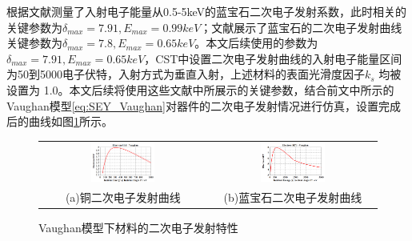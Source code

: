 \documentclass[master]{thesis-uestc}
\begin{document}
根据文献\cite{suharyanto_2006_secondary}测量了入射电子能量从0.5-5keV的蓝宝石二次电子发射系数，此时相关的关键参数为$\delta_{max}=7.91, E_{max}=0.99keV$；文献\cite{chvyreva_2014_experimental}展示了蓝宝石的二次电子发射曲线关键参数为$\delta_{max}=7.8, E_{max}=0.65keV$。本文后续使用的参数为$\delta_{max}=7.91, E_{max}=0.65keV$，CST中设置二次电子发射曲线的入射电子能量区间为50到5000电子伏特，入射方式为垂直入射，上述材料的表面光滑度因子\(k_s\) 均被设置为 1.0。本文后续将使用这些文献中所展示的关键参数，结合前文中所示的Vaughan模型\ref{eq:SEY_Vaughan}对器件的二次电子发射情况进行仿真，设置完成后的曲线如图\ref{fig:X波段材料二次电子发射特性}所示。
\begin{figure}[!htb]
    \small
    \centering
    \begin{tabular}{@{\ }c@{\ }c}
        \includegraphics[width=0.4\textwidth]{pic/chapter3/铜的SEY.png} & 
        \hspace{5pt}
        \includegraphics[width=0.4\textwidth]{pic/chapter3/蓝宝石的SEY.png}     \\
        \mbox{\small (a)铜二次电子发射曲线}                                                                               & 
        \mbox{\small (b)蓝宝石二次电子发射曲线}                                                                                  \\
    \end{tabular}
    \caption{Vaughan模型下材料的二次电子发射特性}
    \label{fig:X波段材料二次电子发射特性}
\end{figure}
\end{document}
